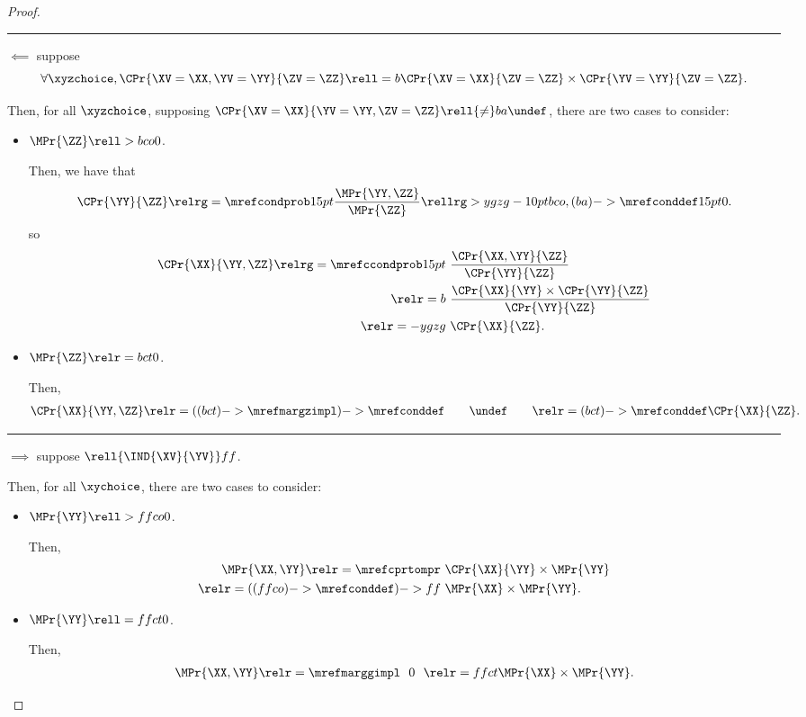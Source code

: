 \begin{proof}
  \hrule
  $\impliedby$ suppose 
  $$\forall \xyzchoice,
  \CPr{\XV = \XX, \YV = \YY}{\ZV = \ZZ} \rell = b 
  \CPr{\XV = \XX}{\ZV = \ZZ}
  \times
  \CPr{\YV = \YY}{\ZV = \ZZ}.$$

  Then, for all $\xyzchoice$, supposing $\CPr{\XV = \XX}{\YV = \YY, \ZV = \ZZ} \rell {\ne} ba \undef$, there are two cases to consider:
  \begin{itemize}
    \item $\MPr{\ZZ} \rell > bco 0$.

      Then, we have that
      $$\CPr{\YY}{\ZZ} \relrg = {\mrefcondprob} 15pt \frac{\MPr{ \YY, \ZZ}}{\MPr{\ZZ}} \rellrg > ygzg -10pt {bco,(ba)->\mrefconddef} 15pt 0.$$
      so
      \begin{align*}
        \CPr{\XX}{\YY, \ZZ}
        \relrg = {\mrefccondprob} 15pt \ & 
        \frac{\CPr{\XX, \YY}{\ZZ}}{\CPr{\YY}{\ZZ}}
        \\
        \relr = b \ & \frac{\CPr{\XX}{\YY} \times \CPr{\YY}{\ZZ}}{\CPr{\YY}{\ZZ}}\\
        \relr = -ygzg \ & \CPr{\XX}{\ZZ}.
      \end{align*}
    \item $\MPr{\ZZ} \relr = bct 0$.

      Then,
      \begin{align*}
        \CPr{\XX}{\YY, \ZZ}
        \relr = {((bct)->\mrefmargzimpl)->\mrefconddef}
        \ \ \ \ 
        \ \ 
        \undef
        \ \ \ \ 
        \ \ 
        \relr = {(bct)->\mrefconddef} \CPr{\XX}{\ZZ}.
      \end{align*}
  \end{itemize}
  \hrule
  $\implies$ suppose $\rell {\IND{\XV}{\YV}} ff $.

  Then, for all $\xychoice$, there are two cases to consider:
  \begin{itemize}
    \item $\MPr{\YY} \rell > ffco 0$.

    Then,
    \begin{align*}
      \MPr{\XX, \YY}
      \relr = {\mrefcprtompr} &\ \CPr{\XX}{\YY} \times \MPr{\YY}\\
      \relr = {((ffco)->\mrefconddef)->ff} &\ \MPr{\XX} \times \MPr{\YY}.
    \end{align*}

    \item $\MPr{\YY} \rell = ffct 0$.

    Then,
    \begin{align*}
      \MPr{\XX, \YY} \relr = {\mrefmarggimpl} \ \ 0\ \ 
      \relr = ffct \MPr{\XX} \times \MPr{\YY}.
    \end{align*}
  \end{itemize}


\end{proof}

